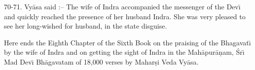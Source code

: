 70-71. Vy\=asa said :-- The wife of Indra accompanied the messenger of the Dev\={\i} and quickly reached the presence of her husband Indra. She was very pleased to see her long-wished for husband, in the state disguise.

Here ends the Eighth Chapter of the Sixth Book on the praising of the Bhagavat\={\i} by the wife of Indra and on getting the sight of Indra in the Mah\=apur\=a\d{n}am, \'Sr\={\i} Mad Dev\={\i} Bh\=agavatam of 18,000 verses by Mahar\d{s}i Veda Vy\=asa.



